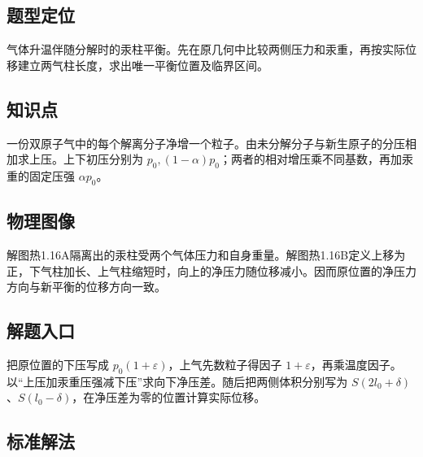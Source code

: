 \documentclass[UTF8,fontset=fandol,a4paper,11pt]{ctexart}
\begin{document}


\subsection*{题型定位}

气体升温伴随分解时的汞柱平衡。先在原几何中比较两侧压力和汞重，再按实际位移建立两气柱长度，求出唯一平衡位置及临界区间。



\subsection*{知识点}

一份双原子气中的每个解离分子净增一个粒子。由未分解分子与新生原子的分压相加求上压。上下初压分别为 $p_0,(1-\alpha)p_0$；两者的相对增压乘不同基数，再加汞重的固定压强 $\alpha p_0$。



\subsection*{物理图像}

解图热1.16A隔离出的汞柱受两个气体压力和自身重量。解图热1.16B定义上移为正，下气柱加长、上气柱缩短时，向上的净压力随位移减小。因而原位置的净压力方向与新平衡的位移方向一致。



\subsection*{解题入口}

把原位置的下压写成 $p_0(1+\varepsilon)$，上气先数粒子得因子 $1+\varepsilon$，再乘温度因子。以“上压加汞重压强减下压”求向下净压差。随后把两侧体积分别写为 $S(2l_0+\delta)$、$S(l_0-\delta)$，在净压差为零的位置计算实际位移。



\subsection*{标准解法}
\end{document}
